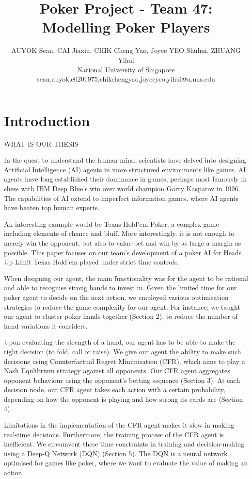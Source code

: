 \documentclass{article}
\title{Poker Project - Team 47: Modelling Poker Players}
\author{
AUYOK Sean, CAI Jiaxiu, CHIK Cheng Yao, Joyce YEO Shuhui, ZHUANG Yihui
\\ 
National University of Singapore\\
sean.auyok,e0201975,chikchengyao,joyceyeo,yihui@u.nus.edu
}
\begin{document}
\maketitle

\section{Introduction}

WHAT IS OUR THESIS

In the quest to understand the human mind, scientists have delved into designing Artificial Intelligence (AI) agents in more structured environments like games. AI agents have long established their dominance in games, perhaps most famously in chess with IBM Deep Blue's win over world champion Garry Kasparov in 1996. %
The capabilities of AI extend to imperfect information games, where AI agents have beaten top human experts. 

An interesting example would be Texas Hold'em Poker, a complex game including elements of chance and bluff. More interestingly, it is not enough to merely win the opponent, but also to value-bet and win by as large a margin as possible. This paper focuses on our team's development of a poker AI for Heads Up Limit Texas Hold'em played under strict time controls. 

When designing our agent, the main functionality was for the agent to be rational and able to recognise strong hands to invest in. Given the limited time for our poker agent to decide on the next action, we employed various optimisation strategies to reduce the game complexity for our agent. For instance, we taught our agent to cluster poker hands together (Section 2), to reduce the number of hand variations it considers.

Upon evaluating the strength of a hand, our agent has to be able to make the right decision (to fold, call or raise). We give our agent the ability to make such decisions using Counterfactual Regret Minimisation (CFR), which aims to play a Nash Equlibrium strategy against all opponents. Our CFR agent aggregates opponent behaviour using the opponent's betting sequence (Section 3). At each decision node, our CFR agent takes each action with a certain probability, depending on how the opponent is playing and how strong its cards are (Section 4).

Limitations in the implementation of the CFR agent makes it slow in making real-time decisions. Furthermore, the training process of the CFR agent is inefficient. We circumvent these time constraints in training and decision-making using a Deep-Q Network (DQN) (Section 5). The DQN is a neural network optimised for games like poker, where we want to evaluate the value of making an action.
\end{document}
